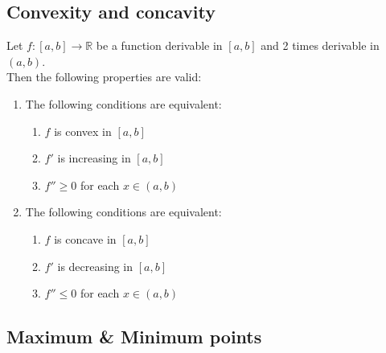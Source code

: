\documentclass[a4paper]{report}
\begin{document}
\subsection{Convexity and concavity}
\begin{tcolorbox}
Let $f:\left [ a,b \right ]\rightarrow \mathbb{R}$ be a function derivable in $\left [ a,b \right ]$ and 2 times derivable in $\left ( a,b \right )$.\\Then the following properties are valid:
\tcblower
\begin{enumerate}
    \item The following conditions are equivalent:
    \begin{enumerate}
        \item $f$ is convex in $\left [ a,b \right ]$
        \item $f'$ is increasing in $\left [ a,b \right ]$
        \item $f'' \geq 0$ for each $x \in \left ( a,b \right )$
    \end{enumerate}
    \item The following conditions are equivalent:
    \begin{enumerate}
        \item $f$ is concave in $\left [ a,b \right ]$
        \item $f'$ is decreasing in $\left [ a,b \right ]$
        \item $f'' \leq 0$ for each $x \in \left ( a,b \right )$
    \end{enumerate}
\end{enumerate}
\end{tcolorbox}
\subsection{Maximum \& Minimum points}
\\ \\ \\
\\ 
\end{document}
